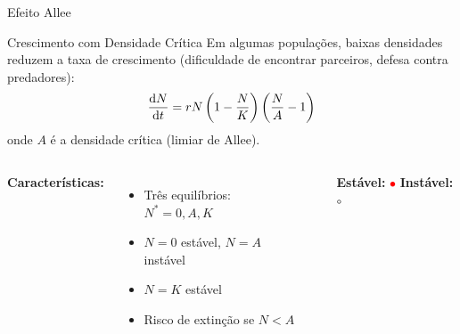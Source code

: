 \begin{frame}{Efeito Allee}
\begin{block}{Crescimento com Densidade Crítica}
Em algumas populações, baixas densidades reduzem a taxa de crescimento (dificuldade de encontrar parceiros, defesa contra predadores):
\begin{equation*}
\frac{\mathrm{d} N}{\mathrm{d} t} = rN\left(1 - \frac{N}{K}\right)\left(\frac{N}{A} - 1\right)
\end{equation*}
onde $A$ é a densidade crítica (limiar de Allee).
\end{block}

\begin{columns}
\textbf{Características:}
\begin{itemize}
    \item Três equilíbrios: $N^* = 0, A, K$
    \item $N = 0$ estável, $N = A$ instável
    \item $N = K$ estável
    \item Risco de extinção se $N < A$
\end{itemize}

\begin{center}
\end{center}
\textbf{Estável:} \textcolor{red}{$\bullet$} \quad
\textbf{Instável:} $\circ$
\end{columns}
\end{frame}

